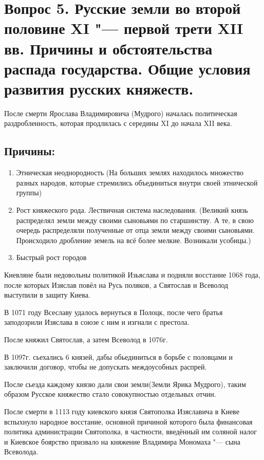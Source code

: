\section{Вопрос 5. Русские земли во второй половине XI "--- первой трети XII вв. Причины и обстоятельства распада государства. Общие условия развития русских княжеств.}

После смерти Ярослава Владимировича (Мудрого) началась политическая раздробленность, которая продлилась с середины XI до начала XII века.

\subsection{Причины:}

\begin{enumerate}
    \item{ Этническая неоднородность (На больших землях находилось множество разных народов, которые стремились объединиться внутри своей этнической группы)}
    \item{ Рост княжеского рода. Лествичная система наследования. (Великий князь распределял земли между своими сыновьями по старшинству. А те, в свою очередь распределяли полученные от отца земли между своими сыновьями. Происходило дробление земель на всё более мелкие. Возникали усобицы.)}
    \item{ Быстрый рост городов}
\end{enumerate}

Киевляне были недовольны политикой Изьяслава и подняли  восстание 1068 года, после которых Изяслав повёл на Русь поляков, а Святослав и Всеволод выступили в защиту Киева.

В 1071 году Всеславу удалось вернуться в Полоцк, после чего братья заподозрили Изяслава в союзе с ним и изгнали с престола. 

После княжил Святослав, а затем Всеволод в 1076г.

В 1097г. сьехались 6 князей, дабы обьединиться в борьбе с половцами и заключили договор, чтобы не допускать междоусобных распрей.

После сьезда каждому князю дали свои земли(Земли Ярика Мудрого), таким образом Русское княжество стало совокупностью отдельных отчин.

После смерти в 1113 году киевского князя Святополка Изяславича в Киеве вспыхнуло народное восстание, основной причиной которого была финансовая политика администрации Святополка, в частности, введённый им соляной налог и Киевское боярство призвало на княжение Владимира Мономаха "--- сына Всеволода.

